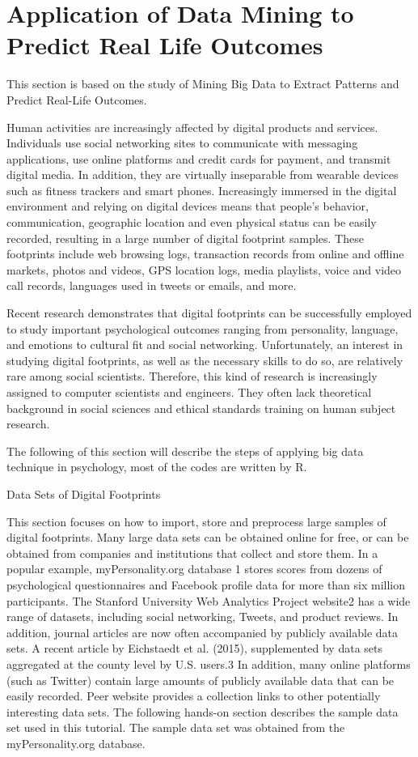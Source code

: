 \section{Application of Data Mining to Predict Real Life Outcomes}

This section is based on the study of Mining Big Data to Extract 
Patterns and Predict Real-Life Outcomes\cite{editor12}.

Human activities are increasingly affected by digital products and
 services. Individuals use social networking sites to communicate 
with messaging applications, use online platforms and credit cards
 for payment, and transmit digital media. In addition, they are 
virtually inseparable from wearable devices such as fitness 
trackers and smart phones. Increasingly immersed in the digital 
environment and relying on digital devices means that people's 
behavior, communication, geographic location and even physical 
status can be easily recorded, resulting in a large number of 
digital footprint samples. These footprints include web browsing 
logs, transaction records from online and offline markets, photos 
and videos, GPS location logs, media playlists, voice and video 
call records, languages used in tweets or emails, and more.

Recent research demonstrates that digital footprints can be 
successfully employed to study important psychological outcomes 
ranging from personality, language, and emotions to cultural fit
 and social networking. Unfortunately, an interest in studying 
digital footprints, as well as the necessary skills to do so, are 
relatively rare among social scientists. Therefore, this kind of 
research is increasingly assigned to computer scientists and 
engineers. They often lack theoretical background in social 
sciences and ethical standards training on human subject research.

The following of this section will describe the steps of applying 
big data technique in psychology, most of the codes are written by R.

Data Sets of Digital Footprints

This section focuses on how to import, store and preprocess large 
samples of digital footprints. Many large data sets can be obtained
 online for free, or can be obtained from companies and 
institutions that collect and store them. In a popular example, 
myPersonality.org database 1 stores scores from dozens of 
psychological questionnaires and Facebook profile data for more 
than six million participants. The Stanford University Web 
Analytics Project website2 has a wide range of datasets, including
 social networking, Tweets, and product reviews. In addition, 
journal articles are now often accompanied by publicly available 
data sets. A recent article by Eichstaedt et al. (2015), 
supplemented by data sets aggregated at the county level by U.S. 
users.3 In addition, many online platforms (such as Twitter) 
contain large amounts of publicly available data that can be easily 
recorded. Peer website provides a collection links to other 
potentially interesting data sets. The following hands-on section 
describes the sample data set used in this tutorial. The sample 
data set was obtained from the myPersonality.org database.

